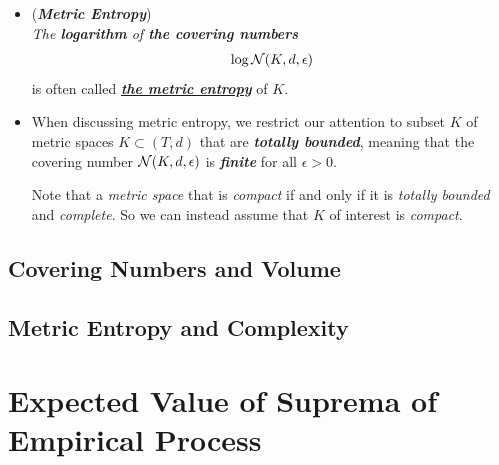 \documentclass[11pt]{article}
\begin{document}
\begin{itemize}
\begin{proof}
To prove the lower bound, choose an $2\epsilon$-separated subset $\cP = \set{x_i}_i$ in $K$ and an $\epsilon$-net $\cN = \set{y_j}_j$ of $K$. By the definition of a net, each point $x_i$ belongs \emph{a closed $\epsilon$-ball centered at some point $y_j$}. Moreover, since any closed $\epsilon$-ball can not contain a pair of $2\epsilon$-separated points, \emph{each $\epsilon$-ball centered at $y_j$ may contain \textbf{at most one point} $x_i$}. The \emph{\textbf{pigeonhole principle}} then yields 
\begin{align*}
\abs{\cP} \le \abs{\cN}.
\end{align*}  Since this happens for arbitrary packing $\cP$ and covering $\cN$, the lower bound in the lemma is proved. \qed
\end{proof}

\item \begin{definition} (\textbf{\emph{Metric Entropy}}) \\
\emph{The \textbf{logarithm} of \textbf{the covering numbers}} 
\begin{align*}
\log {\mathcal N}(K, d, \epsilon)
\end{align*}  is often called \underline{\emph{\textbf{the metric entropy}}} of $K$.
\end{definition}

\item \begin{remark}
When discussing metric entropy, we restrict our attention to subset $K$ of metric spaces $K \subset (T, d)$ that are \emph{\textbf{totally bounded}}, meaning that the covering number ${\mathcal N}(K, d, \epsilon)$ is \emph{\textbf{finite}} for all $\epsilon > 0$. 

Note that  a \emph{metric space} that is \emph{compact} if and only if it is  \emph{totally bounded} and \emph{complete}. So we can instead assume that $K$ of interest is \emph{compact}.
\end{remark}
\end{itemize}
\subsection{Covering Numbers and Volume}

\subsection{Metric Entropy and Complexity}

\section{Expected Value of Suprema of Empirical Process}
\end{document}
